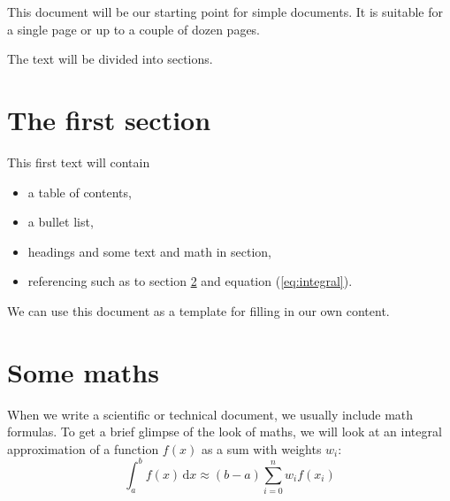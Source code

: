 \documentclass[paper=a4,oneside,fontsize=11pt,
  parskip=full]{scrartcl}
\begin{document}
\tableofcontents
{}
This document will be our starting point for simple
documents. It is suitable for a single page or up to
a couple of dozen pages.

The text will be divided into sections.
\section{The first section}
This first text will contain
\begin{itemize}
\item a table of contents,
\item a bullet list,
\item headings and some text and math in section,
\item referencing such as to section \ref{sec:maths} and
      equation (\ref{eq:integral}).
\end{itemize}
We can use this document as a template for filling in
our own content.
\section{Some maths}
\label{sec:maths}
When we write a scientific or technical document, we usually
include math formulas. To get a brief glimpse of the look of
maths, we will look at an integral approximation of a function
$f(x)$ as a sum with weights $w_i$:
\begin{equation}
  \label{eq:integral}
  \int_a^b f(x)\,\mathrm{d}x \approx (b-a)
  \sum_{i=0}^n w_i f(x_i)
\end{equation}
\end{document}
